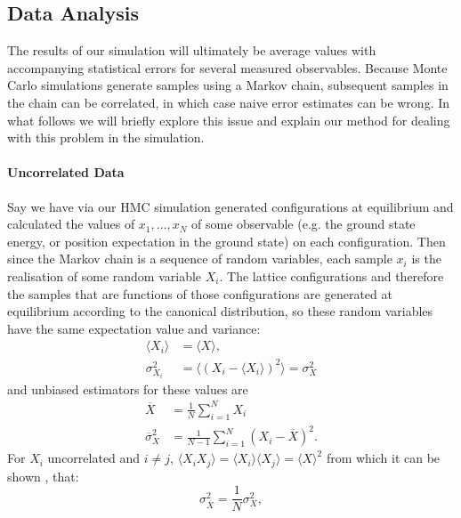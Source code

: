 \documentclass[12pt]{article}
\begin{document}
            \subsection{Data Analysis}
            The results of our simulation will ultimately be average values with accompanying statistical errors for several measured observables. Because Monte Carlo simulations generate samples using a Markov chain, subsequent samples in the chain can be correlated, in which case naive error estimates can be wrong. In what follows we will briefly explore this issue and explain our method for dealing with this problem in the simulation.

            \paragraph{Uncorrelated Data}
            Say we have via our HMC simulation generated configurations at equilibrium and calculated the values of $x_1,\dots,x_N$ of some observable (e.g. the ground state energy, or position expectation in the ground state) on each configuration. Then since the Markov chain is a sequence of random variables, each sample $x_i$ is the realisation of some random variable $X_i$. The lattice configurations and therefore the samples that are functions of those configurations are generated at equilibrium according to the canonical distribution, so these random variables have the same expectation value and variance:
            \begin{align}
                \langle X_i \rangle & = \langle X \rangle, \\
                \sigma^2_{X_i} & = \langle \left(X_i-\langle X_i\rangle\right)^2 \rangle = \sigma_X^2
            \end{align}
            and unbiased estimators for these values are \cite{gattringer_lang_2013}
            \begin{align}
                \overline{X} & = \frac{1}{N}\sum_{i=1}^{N} X_i \\
                \overline{\sigma}_X^2 & = \frac{1}{N-1}\sum_{i=1}^N\left(X_i-\overline{X}\right)^2.
            \end{align}
            For $X_i$ uncorrelated and $i\neq j$, $\langle X_iX_j \rangle = \langle X_i \rangle \langle X_j \rangle = \langle X \rangle^2$ from which it can be shown \cite{gattringer_lang_2013}, that:
            \begin{equation}
                \label{eq:sdRelation1}
                \sigma^2_{\overline{X}} = \frac{1}{N}\sigma^2_X,
            \end{equation}
\end{document}
